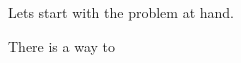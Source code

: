 \documentclass[12pt]{article}
\begin{document}

\vspace{10mm}
\Large
\noindent
Lets start with the problem at hand.


There is a way to 
\end{document}
